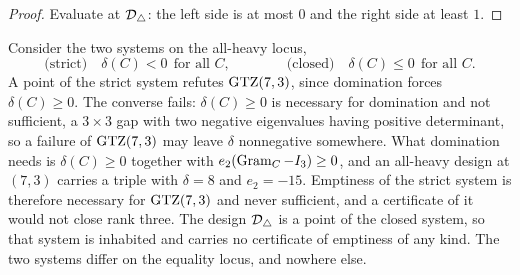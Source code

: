\begin{proof}
Evaluate at $\mathcal{D}_{\triangle}$: the left side is at most $0$ and the right side at least
$1$.
\end{proof}

Consider the two systems on the all-heavy locus,
\[
  \text{(strict)}\quad \delta(C)<0 \ \ \text{for all } C,
  \qquad\qquad
  \text{(closed)}\quad \delta(C)\le0 \ \ \text{for all } C .
\]
A point of the strict system refutes $\mathrm{GTZ}(7,3)$, since domination forces
$\delta(C)\ge0$.  The converse fails: $\delta(C)\ge0$ is necessary for
domination and not sufficient, a $3\times3$ gap with two negative
eigenvalues having positive determinant, so a failure of $\mathrm{GTZ}(7,3)$ may
leave $\delta$ nonnegative somewhere.  What domination needs is
$\delta(C)\ge0$ together with $e_2(\operatorname{Gram}_C-I_3)\ge0$, and an all-heavy
design at $(7,3)$ carries a triple with $\delta=8$ and
$e_2=-15$.  Emptiness of the strict system is therefore necessary for
$\mathrm{GTZ}(7,3)$ and never sufficient, and a certificate of it would not close
rank three.  The design $\mathcal{D}_{\triangle}$ is a point of the closed
system, so that system is inhabited and carries no certificate of
emptiness of any kind.  The two systems differ on the equality locus, and
nowhere else.

